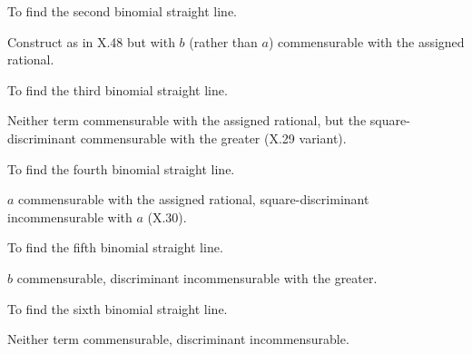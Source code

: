 \documentclass{rrxiv}
\begin{document}
\begin{claim}
\label{prop:X.49}
To find the second binomial straight line.
\end{claim}
\begin{evidence}[Proof of X.49]
\label{ev:X.49}
Construct as in X.48 but with $b$ (rather than $a$) commensurable
with the assigned rational.
\end{evidence}

\begin{claim}
\label{prop:X.50}
To find the third binomial straight line.
\end{claim}
\begin{evidence}[Proof of X.50]
\label{ev:X.50}
Neither term commensurable with the assigned rational, but the
square-discriminant commensurable with the greater (X.29 variant).
\end{evidence}

\begin{claim}
\label{prop:X.51}
To find the fourth binomial straight line.
\end{claim}
\begin{evidence}[Proof of X.51]
\label{ev:X.51}
$a$ commensurable with the assigned rational, square-discriminant
incommensurable with $a$ (X.30).
\end{evidence}

\begin{claim}
\label{prop:X.52}
To find the fifth binomial straight line.
\end{claim}
\begin{evidence}[Proof of X.52]
\label{ev:X.52}
$b$ commensurable, discriminant incommensurable with the greater.
\end{evidence}

\begin{claim}
\label{prop:X.53}
To find the sixth binomial straight line.
\end{claim}
\begin{evidence}[Proof of X.53]
\label{ev:X.53}
Neither term commensurable, discriminant incommensurable.
\end{evidence}
\end{document}
